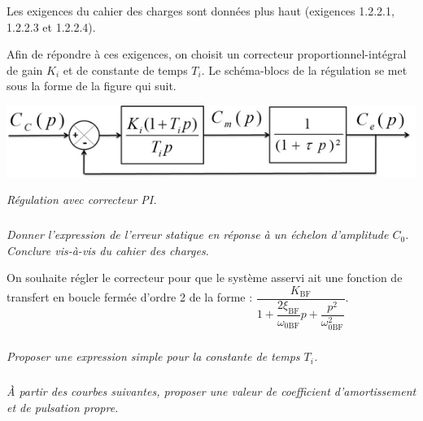 \documentclass[10pt,fleqn]{article} %
\begin{document}
\begin{multicols}{2}
\vspace{.25cm}

Les exigences du cahier des charges sont données plus haut (exigences 1.2.2.1, 1.2.2.3 et 1.2.2.4).

Afin de répondre à ces exigences, on choisit un correcteur proportionnel-intégral de gain $K_i$ et de constante de temps $T_i$. Le schéma-blocs de la régulation se met sous la forme de la figure qui suit.

\begin{center}
\includegraphics[width=\linewidth]{images/fig_08}

\textit{Régulation avec correcteur PI.}
\end{center}


\subparagraph{}
\textit{Donner l’expression de l’erreur statique en réponse à un échelon d'amplitude $C_0$. Conclure vis-à-vis du cahier des charges.}
\ifprof
\begin{corrige}
\end{corrige}
\else
\fi

\vspace{.25cm}

On souhaite régler le correcteur pour que le système asservi ait une fonction de transfert en boucle fermée
d’ordre 2 de la forme :
$\dfrac{K_{\text{BF}}}{1+\dfrac{2\xi_{\text{BF}}}{\omega_{0\text{BF}}}p+\dfrac{p^2}{\omega_{0\text{BF}}^2}}$.


\subparagraph{}
\textit{Proposer une expression simple pour la constante de temps $T_i$.}
\ifprof
\begin{corrige}
\end{corrige}
\else
\fi



\subparagraph{}
\textit{À partir des courbes suivantes, proposer une valeur de coefficient d'amortissement et de pulsation propre.}


\end{multicols}
\end{document}
